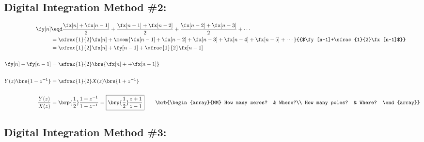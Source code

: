 \subsection{Digital Integration Method \#2: }
 
{\begin{align*}
  \fy[n]
    &\eqd \frac{\fx[n]+\fx[n-1]}{2} + \frac{\fx[n-1]+\fx[n-2]}{2} + \frac{\fx[n-2]+\fx[n-3]}{2} + \cdots
  \\&=    \sfrac{1}{2}\fx[n] + \mcom{\fx[n-1] + \fx[n-2] + \fx[n-3] + \fx[n-4] + \fx[n-5] + \cdots}{{$\fy[n-1]+\sfrac{1}{2}\fx[n-1]$}}
  \\&=    \sfrac{1}{2}\fx[n] + \fy[n-1]+\sfrac{1}{2}\fx[n-1]
  \\\\
  \fy[n]-\fy[n-1]&=    \sfrac{1}{2}\brs{\fx[n] + +\fx[n-1]} 
  \\\\
  Y(z)\brs{1-z^{-1}} &= \sfrac{1}{2} X(z)\brs{1+z^{-1}}
  \\\\
  \frac{Y(z)}{X(z)} 
    &= \brp{\frac{1}{2}} \frac{1+z^{-1}}{1-z^{-1}}
     = \boxed{\brp{\frac{1}{2}} \frac{z+1}{z-1}} 
  \qquad\brb{\begin{array}{MM}
    How many zeros? & Where?\\
    How many poles? & Where?
  \end{array}}
\end{align*}}

\subsection{Digital Integration Method \#3:  }

